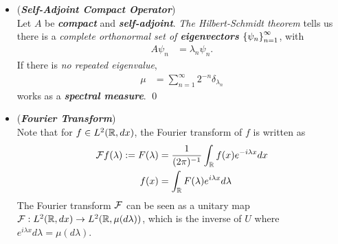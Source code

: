 \documentclass[11pt]{article}
\begin{document}
\begin{itemize}
\begin{example}
If we take 
\begin{align*}
\bar{\mu} &= \sum_{i=1}^{n}a_i \delta_{\lambda_i},
\end{align*} with $a_1 \xdotx{,} a_n >0$, $A$ \emph{can also be represented as \textbf{multiplication} by $\lambda$ on $L^2(\bR, \bar{\mu})$}. 
Thus, we explicitly see \emph{the \textbf{nonuniqueness} of the \textbf{measure}} in this case. 

We can also see when \emph{\textbf{more than one measure is needed}}: 
\emph{one can represent a finite-dimensional self-adjoint operator as multiplication on $L^2(\bR,\mu)$ with \textbf{only one measure} \textbf{if and only if} $A$ has \textbf{no repeated eigenvalues}}. \qed
\end{example}

\item \begin{example}  (\emph{\textbf{Self-Adjoint Compact Operator}})\\
Let $A$ be \textbf{\emph{compact}} and \textbf{\emph{self-adjoint}}. \emph{The Hilbert-Schmidt theorem} tells us there is a \emph{complete orthonormal set of \textbf{eigenvectors}} $\left\{\psi_n\right\}_{n=1}^{\infty}$, with
\begin{align*}
A \psi_n &= \lambda_n \psi_n.
\end{align*}
If there is \emph{no repeated eigenvalue}, 
\begin{align}
\mu &= \sum_{n=1}^{\infty}2^{-n}\delta_{\lambda_n}  \label{eqn: spectral_measure_compact}
\end{align}
works as a \emph{\textbf{spectral measure}}. \qed
\end{example}

\item \begin{example}  (\emph{\textbf{Fourier Transform}})\\
Note that for $f \in L^2({\mathbb R}, dx)$, the Fourier transform of $f$ is written as
\begin{align*}
{\mathcal F} f(\lambda) := F(\lambda)&=  \frac{1}{(2\pi)^{-1}}\int_{{\mathbb R}}f(x) e^{-i \lambda x} dx \\
f(x) &= \int_{{\mathbb R}} F(\lambda) e^{i \lambda x} d\lambda
\end{align*}
The Fourier transform ${\mathcal F}$ can be seen as a unitary map ${\mathcal F}: L^2({\mathbb R}, dx) \rightarrow  L^2({\mathbb R}, \mu(d\lambda))$, which is the inverse of $U$ where $ e^{i \lambda x} d\lambda = \mu(d\lambda)$.


\end{example}
\end{itemize}
\end{document}
